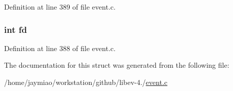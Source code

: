 \-Definition at line 389 of file event.\-c.

\hypertarget{structev__x__once_a6f8059414f0228f0256115e024eeed4b}{
\subsubsection[{fd}]{\setlength{\rightskip}{0pt plus 5cm}int {\bf fd}}}\label{structev__x__once_a6f8059414f0228f0256115e024eeed4b}


\-Definition at line 388 of file event.\-c.



\-The documentation for this struct was generated from the following file\-:\begin{DoxyCompactItemize}
\item 
/home/jaymiao/workstation/github/libev-\/4./\hyperlink{event_8c}{event.\-c}\end{DoxyCompactItemize}
